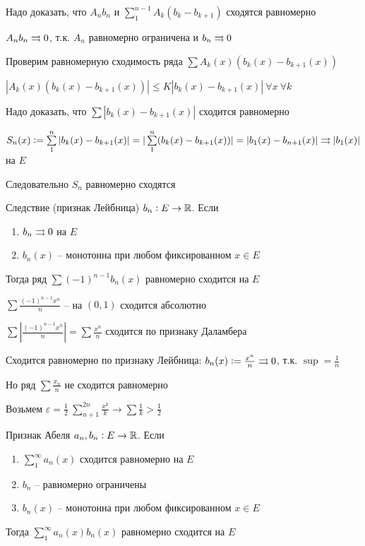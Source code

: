 \documentclass[12pt]{article}
\begin{document}
Надо доказать, что $A_n b_n$ и $\sum\limits_1^{n - 1} A_k (b_k - b_{k + 1})$ сходятся равномерно

$A_nb_n \rightrightarrows 0$, т.к. $A_n$ равномерно ограничена и $b_n \rightrightarrows 0$

Проверим равномерную сходимость ряда $\sum A_k(x)(b_k(x) - b_{k + 1}(x))$

$|A_k(x)(b_k(x) - b_{k + 1}(x))| \leq K |b_k(x) - b_{k + 1}(x)|\ \forall x\ \forall k$

Надо доказать, что $\sum |b_k(x) - b_{k + 1}(x)|$ сходится равномерно

$S_n(x) := \sum\limits_1^n |b_k(x) - b_{k + 1}(x)| = |\sum\limits_1^n (b_k(x) - b_{k + 1}(x))| = |b_1(x) - b_{n + 1}(x)| \rightrightarrows |b_1(x)|$ на $E$

Следовательно $S_n$ равномерно сходятся

\begin{theo}{Следствие (признак Лейбница)}
    $b_n : E \to \mathbb R$. Если

    \begin{enumerate}
        \item $b_n \rightrightarrows 0$ на $E$
        \item $b_n(x)$ -- монотонна при любом фиксированном $x \in E$
    \end{enumerate}

    Тогда ряд $\sum (-1)^{n-1}b_n(x)$ равномерно сходится на $E$
\end{theo}

\begin{Example}{}
    $\sum \frac{(-1)^{n-1}x^n}{n}$ -- на $(0, 1)$ сходится абсолютно

    $\sum |\frac{(-1)^{n-1}x^n}{n}| = \sum \frac{x^n}{n}$ сходится по признаку Даламбера 

    Сходится равномерно по признаку Лейбница: $b_n(x) := \frac{x^n}{n} \rightrightarrows 0$, т.к. $\sup = \frac{1}{n}$

    Но ряд $\sum \frac{x_n}{n}$ не сходится равномерно 

    Возьмем $\varepsilon = \frac{1}{2}\ \sum\limits_{n + 1}^{2n} \frac{x^k}{k} \to \sum \frac{1}{k} > \frac{1}{2}$
\end{Example}

\begin{theo}{Признак Абеля}
    $a_n, b_n : E \to \mathbb R$. Если

    \begin{enumerate}
        \item $\sum\limits_1^\infty a_n(x)$ сходится равномерно на $E$
        \item $b_n$ -- равномерно ограничены 
        \item $b_n(x)$ -- монотонна при любом фиксированном $x \in E$
    \end{enumerate}

    Тогда $\sum\limits_1^\infty a_n(x)b_n(x)$ равномерно сходится на $E$
\end{theo}
\end{document}
